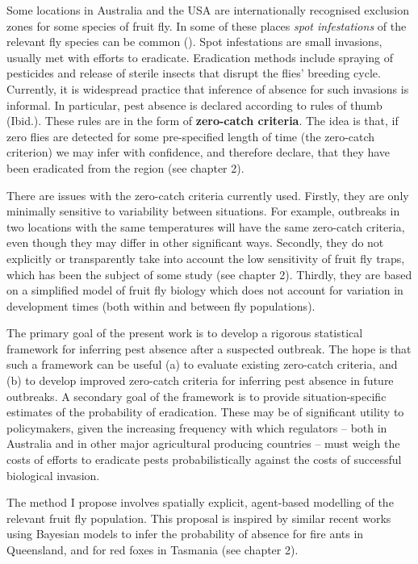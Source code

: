 \documentclass[
  oneside]{book}
\begin{document}
Some locations in Australia and the USA are internationally recognised exclusion zones for some species of fruit fly. In some of these places \emph{spot infestations} of the relevant fly species can be common (\citet{meats2005}). Spot infestations are small invasions, usually met with efforts to eradicate. Eradication methods include spraying of pesticides and release of sterile insects that disrupt the flies' breeding cycle. Currently, it is widespread practice that inference of absence for such invasions is informal. In particular, pest absence is declared according to rules of thumb (Ibid.). These rules are in the form of \textbf{zero-catch criteria}. The idea is that, if zero flies are detected for some pre-specified length of time (the zero-catch criterion) we may infer with confidence, and therefore declare, that they have been eradicated from the region (see chapter 2).

There are issues with the zero-catch criteria currently used. Firstly, they are only minimally sensitive to variability between situations. For example, outbreaks in two locations with the same temperatures will have the same zero-catch criteria, even though they may differ in other significant ways. Secondly, they do not explicitly or transparently take into account the low sensitivity of fruit fly traps, which has been the subject of some study (see chapter 2). Thirdly, they are based on a simplified model of fruit fly biology which does not account for variation in development times (both within and between fly populations).

The primary goal of the present work is to develop a rigorous statistical framework for inferring pest absence after a suspected outbreak. The hope is that such a framework can be useful (a) to evaluate existing zero-catch criteria, and (b) to develop improved zero-catch criteria for inferring pest absence in future outbreaks. A secondary goal of the framework is to provide situation-specific estimates of the probability of eradication. These may be of significant utility to policymakers, given the increasing frequency with which regulators -- both in Australia and in other major agricultural producing countries -- must weigh the costs of efforts to eradicate pests probabilistically against the costs of successful biological invasion.

The method I propose involves spatially explicit, agent-based modelling of the relevant fruit fly population. This proposal is inspired by similar recent works using Bayesian models to infer the probability of absence for fire ants in Queensland, and for red foxes in Tasmania (see chapter 2).
\end{document}
